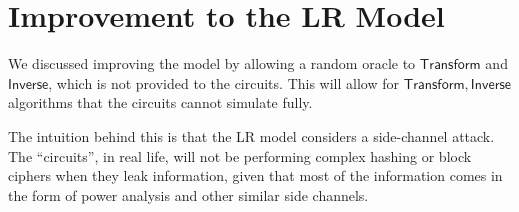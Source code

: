 \documentclass[11pt,twoside]{article}
\begin{document}
\section{Improvement to the LR Model}

We discussed improving the model by allowing a random oracle to $\mathsf{Transform}$ and $\mathsf{Inverse}$, which is not provided to the circuits. This will allow for $\mathsf{Transform, Inverse}$ algorithms that the circuits cannot simulate fully. 

The intuition behind this is that the LR model considers a side-channel attack. The ``circuits'', in real life, will not be performing complex hashing or block ciphers when they leak information, given that most of the information comes in the form of power analysis and other similar side channels. 
\end{document}
